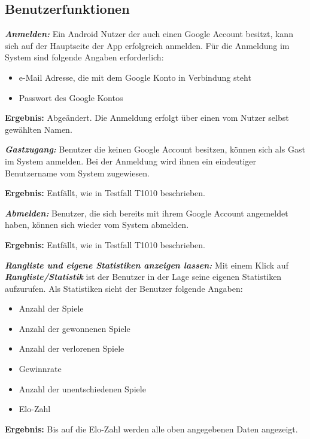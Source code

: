 \documentclass[parskip=full]{scrartcl}
\begin{document}
\subsection{Benutzerfunktionen}
\begin{description}
	\item[F1010] \textbf{\textit{Anmelden: }} Ein Android Nutzer der auch einen Google Account besitzt, kann sich auf der Hauptseite der App erfolgreich anmelden. Für die Anmeldung im System sind folgende Angaben erforderlich:
	\begin{itemize}
		\item e-Mail Adresse, die mit dem Google Konto in Verbindung steht
		\item Passwort des Google Kontos
	\end{itemize}  
	\item \textbf{Ergebnis: } Abgeändert. Die Anmeldung erfolgt über einen vom Nutzer selbst gewählten Namen.

	\item[F1020] \textbf{\textit{Gastzugang: }} Benutzer die keinen Google Account besitzen, können sich als Gast im System anmelden. Bei der Anmeldung wird ihnen ein eindeutiger Benutzername vom System zugewiesen.
	\item \textbf{Ergebnis: } Entfällt, wie in Testfall T1010 beschrieben.
	
	\item[F1030] \textbf{\textit{Abmelden: }} Benutzer, die sich bereits mit ihrem Google Account angemeldet haben, können sich wieder vom System abmelden.
	\item \textbf{Ergebnis: } Entfällt, wie in Testfall T1010 beschrieben.
	
	
	\item [F1040] \textbf{\textit{Rangliste und eigene Statistiken anzeigen lassen: }} Mit einem Klick auf \textbf{\textit{Rangliste/Statistik }} ist der Benutzer in der Lage seine eigenen Statistiken aufzurufen. Als Statistiken sieht der Benutzer folgende Angaben:
	
	\begin{itemize}
		\item Anzahl der Spiele
		\item Anzahl der gewonnenen Spiele
		\item Anzahl der verlorenen Spiele
		\item Gewinnrate
		\item Anzahl der unentschiedenen Spiele
		\item Elo-Zahl		
	\end{itemize}
	\item \textbf{Ergebnis: } Bis auf die Elo-Zahl werden alle oben angegebenen Daten angezeigt.
	

\end{description}
\end{document}
